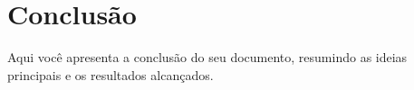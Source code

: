 \chapter{Conclusão}
Aqui você apresenta a conclusão do seu documento, resumindo as ideias principais e os resultados alcançados.

\clearpage
